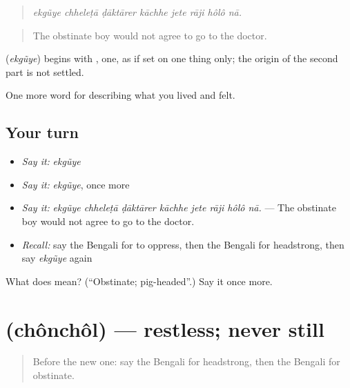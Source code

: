 \begin{quote}
\emph{ekgũye chheleṭā ḍāktārer kāchhe jete rāji hôlô nā.}
\end{quote}

\begin{quote}
The obstinate boy would not agree to go to the doctor.
\end{quote}

\begin{cousinweb}
\textbf{} (\emph{ekgũye}) begins with , one, as if set on one thing only; the origin of the second part is not settled.
\end{cousinweb}

\begin{grammarlens}[title={What you've built}]
One more word for describing what you lived and felt.
\end{grammarlens}

\subsection*{Your turn}
\begin{itemize}
\raggedright
  \item \emph{Say it:} \emph{ekgũye}
  \item \emph{Say it:} \emph{ekgũye}, once more
  \item \emph{Say it:} \emph{ekgũye chheleṭā ḍāktārer kāchhe jete rāji hôlô nā.} — The obstinate boy would not agree to go to the doctor.
  \item \emph{Recall:} say the Bengali for to oppress, then the Bengali for headstrong, then say \emph{ekgũye} again
\end{itemize}

\begin{tcolorbox}[breakable,colback=teal!4,colframe=teal!35!black,title={Before you move on}]
What does  mean? (\textquotedblleft{}Obstinate; pig-headed\textquotedblright{}.) Say it once more.
\end{tcolorbox}
\section[\texorpdfstring{\bn{চঞ্চল} (chônchôl)}{চঞ্চল (chônchôl)}]{ (chônchôl) — restless; never still}

\label{lesson:BN-C461-chonchol}



\begin{quote}
Before the new one: say the Bengali for headstrong, then the Bengali for obstinate.
\end{quote}

